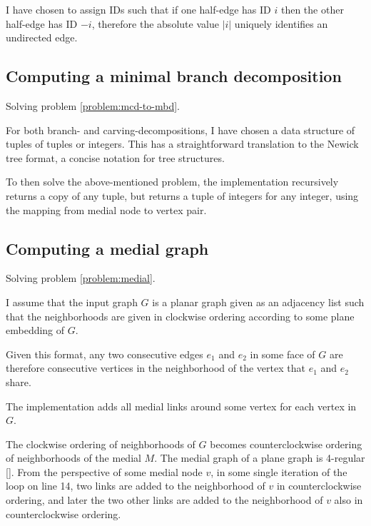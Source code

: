 \documentclass{article}
\begin{document}
	I have chosen to assign IDs such that if one half-edge has ID $i$ then the other half-edge has ID $-i$, therefore the absolute value $|i|$ uniquely identifies an undirected edge.


	\subsection{Computing a minimal branch decomposition}\label{impl:mcd-to-mbd}
		
		Solving problem \ref{problem:mcd-to-mbd}.

		For both branch- and carving-decompositions, I have chosen a data structure of tuples of tuples or integers. This has a straightforward translation to the Newick tree format, a concise notation for tree structures.

		To then solve the above-mentioned problem, the implementation recursively returns a copy of any tuple, but returns a tuple of integers for any integer, using the mapping from medial node to vertex pair.

		
	\subsection{Computing a medial graph}\label{impl:medial}
		
		Solving problem \ref{problem:medial}.

		I assume that the input graph $G$ is a planar graph given as an adjacency list such that the neighborhoods are given in clockwise ordering according to some plane embedding of $G$.
		
		Given this format, any two consecutive edges $e_1$ and $e_2$ in some face of $G$ are therefore consecutive vertices in the neighborhood of the vertex that $e_1$ and $e_2$ share.

		The implementation adds all medial links around some vertex for each vertex in $G$. 
		
		The clockwise ordering of neighborhoods of $G$ becomes counterclockwise ordering of neighborhoods of the medial $M$. The medial graph of a plane graph is 4-regular \ref{}. From the perspective of some medial node $v$, in some single iteration of the loop on line 14, two links are added to the neighborhood of $v$ in counterclockwise ordering, and later the two other links are added to the neighborhood of $v$ also in counterclockwise ordering.
		
\end{document}
